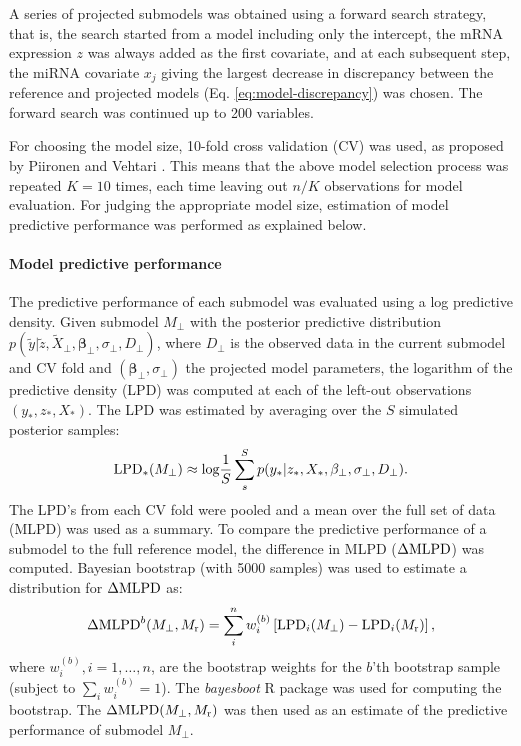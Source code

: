 A series of projected submodels was obtained using a
forward search strategy, that is, the search started from a model including
only the intercept, the mRNA expression $z$ was always added as the first
covariate, and at each subsequent step, the miRNA covariate $x_j$ giving the
largest decrease in discrepancy between the reference and projected models 
(Eq. \eqref{eq:model-discrepancy}) was
chosen. The forward search was continued up to 200 variables.

For choosing the model size, 10-fold cross validation (CV) was used, as proposed by
Piironen and Vehtari \citep{Piironen2016}. This means that the above model selection
process was repeated $K=10$ times, each time leaving out $n/K$ observations for
model evaluation. For judging the appropriate model size, estimation of model
predictive performance was performed as explained below.

\paragraph{Model predictive performance}
The predictive performance of each submodel was evaluated using 
a log predictive density.
Given submodel $M_\perp$ with the posterior predictive distribution
$p(\tilde{y}| \tilde{z}, \tilde{X}_\perp, \mathbf{\beta}_\perp, \sigma_\perp, D_\perp)$,
where $D_\perp$ is the observed data in the current submodel and CV fold and
$(\mathbf{\beta}_\perp, \sigma_\perp)$ the projected model parameters, the logarithm of the predictive density
(LPD) was computed at each of the left-out observations $(y_*, z_*, X_*)$.
The LPD was estimated by averaging over the $S$ simulated posterior samples:
\[
	\textup{LPD}_*(M_\perp) \approx \textup{log}\frac{1}{S} \sum_s^S p(y_*| z_*, X_*, \mathbf{\beta}_\perp, \sigma_\perp, D_\perp).
\]
The LPD's from each CV fold were pooled and a mean over the full set of data
(MLPD) was used as a summary. To compare the predictive performance of a
submodel to the full reference model, the difference in MLPD ($\Delta \textup{MLPD}$) was
computed. Bayesian bootstrap \citep{Rubin1981} (with 5000 samples) was used to estimate a
distribution for $\Delta \textup{MLPD}$ as:
\[
	\Delta \textup{MLPD}^{b}(M_\perp,M_{\textup{r}}) = \sum_i^n w_i^{(b)} \left [ \textup{LPD}_i(M_\perp) - \textup{LPD}_i(M_{\textup{r}}) \right ],
\]
where $w_i^{(b)}, i = 1, \dotsc,n$, are the bootstrap weights
for the $b$'th bootstrap sample (subject to $\sum_i w_i^{(b)} = 1$).
The \emph{bayesboot} R package was used for computing the bootstrap.
The $\Delta \textup{MLPD}(M_\perp,M_{\textup{r}})$ was then used
as an estimate of the predictive performance of submodel $M_\perp$.

